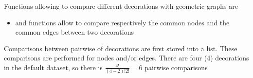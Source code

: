 \documentclass[article]{jss}\usepackage{knitr}
\begin{document}
Functions allowing to compare different decorations with geometric graphs are

\begin{itemize}
\setlength\itemsep{.1em}
  \item {} and  functions allow to compare respectively the common nodes and the common edges between two decorations
\end{itemize}

Comparisons between pairwise of decorations are first stored into a list. These comparisons are performed for nodes and/or edges. There are four (4) decorations in the default dataset, so there is $\frac{4!}{(4-2)!2!}={6}$ pairwise comparisons

\begin{kframe}
\begin{alltt}
 \hlkwb{<-} \hlstd{)}
 \hlkwb{<-} \hlstd{(}\hlstd{=}\hlstd{(g.compar[[}\hlstd{]][[}\hlstd{]]}\hlopt{$}
\hlstd{+ }                                       \hlstd{g.compar[[}\hlstd{]][[}\hlstd{]]}\hlopt{$}
\hlstd{+ }                                       \hlstd{g.compar[[}\hlstd{]][[}\hlstd{]]}\hlopt{$}
\hlstd{+ }                                       \hlstd{g.compar[[}\hlstd{]][[}\hlstd{]]}\hlopt{$}
\hlstd{+ }                                       \hlstd{g.compar[[}\hlstd{]][[}\hlstd{]]}\hlopt{$}
\hlstd{+ }                                       \hlstd{g.compar[[}\hlstd{]][[}\hlstd{]]}\hlopt{$}
\hlstd{+ }                              \hlstd{=}\hlstd{(g.compar[[}\hlstd{]][[}\hlstd{]]}\hlopt{$}
\hlstd{+ }                                       \hlstd{g.compar[[}\hlstd{]][[}\hlstd{]]}\hlopt{$}
\hlstd{+ }                                       \hlstd{g.compar[[}\hlstd{]][[}\hlstd{]]}\hlopt{$}
\hlstd{+ }                                       \hlstd{g.compar[[}\hlstd{]][[}\hlstd{]]}\hlopt{$}
\hlstd{+ }                                       \hlstd{g.compar[[}\hlstd{]][[}\hlstd{]]}\hlopt{$}
\hlstd{+ }                                       \hlstd{g.compar[[}\hlstd{]][[}\hlstd{]]}\hlopt{$}
\hlopt{::}
\hlstd{+ }                     \hlstd{=}\hlstd{,}
\hlstd{+ }                     \hlstd{=}\hlstd{,}
\hlstd{+ }                     \hlstd{=}\hlstd{),}
\hlstd{+ }      \hlstd{=}\hlstd{)}
\end{alltt}
\end{kframe}%
\end{document}
